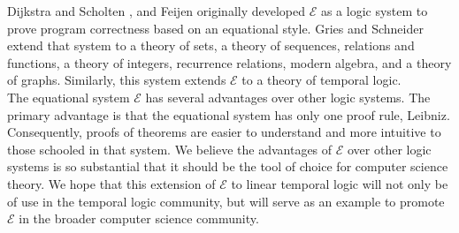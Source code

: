 \documentclass[fleqn, leqno]{article}
\begin{document}
Dijkstra and Scholten \cite{DandS}, and Feijen \cite{Feij} originally developed $\mathcal{E}$ as a logic system to prove
program correctness based on an equational style.
Gries and Schneider extend that system to a theory of sets, a theory of sequences,
relations and functions, a theory of integers, recurrence relations, modern algebra, and a theory of graphs.
Similarly, this system extends $\mathcal{E}$ to a theory of temporal logic.\\

The equational system $\mathcal{E}$ has several advantages over other logic systems.
The primary advantage is that the equational system has only one proof rule, Leibniz.
Consequently, proofs of theorems are easier to understand and more intuitive to those schooled in that system. 
We believe the advantages of $\mathcal{E}$ over other logic systems is so substantial that it should be the
tool of choice for computer science theory.
We hope that this extension of $\mathcal{E}$ to linear temporal logic will not only be of use in the
temporal logic community, but will serve as an example to promote $\mathcal{E}$ in the broader computer science community.



\end{document}
